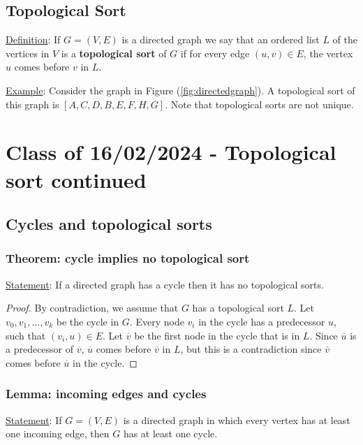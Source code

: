 \documentclass[10pt]{extarticle}
\begin{document}
\subsection{Topological Sort}

\underline{Definition}: If $G = (V, E)$ is a directed graph we say that an ordered list $L$ of the vertices in $V$ is a \textbf{topological sort} of $G$ if for every edge $(u, v) \in E$, the vertex $u$ comes before $v$ in $L$.

\underline{Example}: Consider the graph in Figure (\ref{fig:directedgraph}). A topological sort of this graph is $[A, C, D, B, E, F, H, G]$.
Note that topological sorts are not unique.

\section{Class of 16/02/2024 - Topological sort continued}

\subsection{Cycles and topological sorts}

\subsubsection{Theorem: cycle implies no topological sort}

\underline{Statement}: If a directed graph has a cycle then it has no topological sorts.

\begin{proof}
    By contradiction, we assume that $G$ has a topological sort $L$.
    Let $v_0, v_1, \dots, v_k$ be the cycle in $G$.
    Every node $v_i$ in the cycle has a predecessor $u$, such that $(v_i, u) \in E$.
    Let $\overline{v}$ be the first node in the cycle that is in $L$.
    Since $\overline {u}$ is a predecessor of $\overline{v}$, $\overline{u}$ comes before $\overline{v}$ in $L$,
    but this is a contradiction since $\overline{v}$ comes before $\overline{u}$ in the cycle.
\end{proof}

\subsubsection{Lemma: incoming edges and cycles}

\underline{Statement}: If $G = (V, E)$ is a directed graph in which every vertex has at least one incoming edge, then $G$ has at least one cycle.
\end{document}
